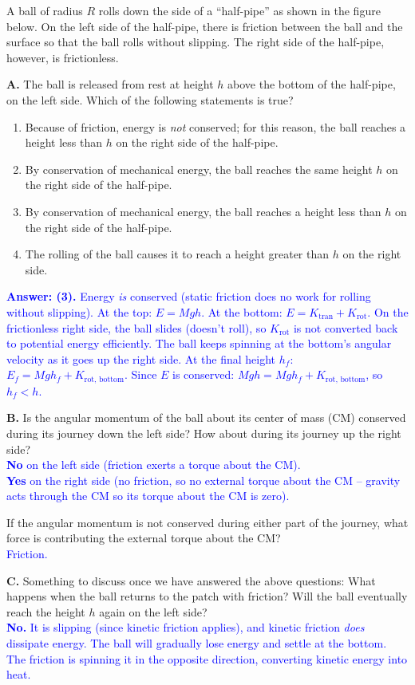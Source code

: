 \documentclass[11pt, letterpaper, openany]{book}
\newenvironment{exercise}[1][Exercise]{%
  \tcolorbox[blanker, breakable, left=1em,
    before skip=1em, after skip=1em,
    borderline west={3pt}{0pt}{PhysNavy},
    colback=PhysCream,
    before upper={\textcolor{PhysNavy}{\sffamily\bfseries #1:}\space}
  ]%
}{%
  \endtcolorbox%
}
\begin{document}
\begin{exercise}[Exercise 5]
A ball of radius $R$ rolls down the side of a ``half-pipe'' as shown in the figure below. On the left side of the half-pipe, there is friction between the ball and the surface so that the ball rolls without slipping. The right side of the half-pipe, however, is frictionless.

\textbf{A.} The ball is released from rest at height $h$ above the bottom of the half-pipe, on the left side. Which of the following statements is true?
\begin{enumerate}
    \item Because of friction, energy is \textit{not} conserved; for this reason, the ball reaches a height less than $h$ on the right side of the half-pipe.
    \item By conservation of mechanical energy, the ball reaches the same height $h$ on the right side of the half-pipe.
    \item By conservation of mechanical energy, the ball reaches a height less than $h$ on the right side of the half-pipe.
    \item The rolling of the ball causes it to reach a height greater than $h$ on the right side.
\end{enumerate}
\textcolor{blue}{
\textbf{Answer: (3).} Energy \textit{is} conserved (static friction does no work for rolling without slipping). At the top: $E = Mgh$. At the bottom: $E = K_{\text{tran}} + K_{\text{rot}}$. On the frictionless right side, the ball slides (doesn't roll), so $K_{\text{rot}}$ is not converted back to potential energy efficiently. The ball keeps spinning at the bottom's angular velocity as it goes up the right side. At the final height $h_f$: $E_f = Mgh_f + K_{\text{rot, bottom}}$. Since $E$ is conserved: $Mgh = Mgh_f + K_{\text{rot, bottom}}$, so $h_f < h$.
}

\textbf{B.} Is the angular momentum of the ball about its center of mass (CM) conserved during its journey down the left side? How about during its journey up the right side? \\
\textcolor{blue}{
\textbf{No} on the left side (friction exerts a torque about the CM). \\
\textbf{Yes} on the right side (no friction, so no external torque about the CM -- gravity acts through the CM so its torque about the CM is zero).
}

If the angular momentum is not conserved during either part of the journey, what force is contributing the external torque about the CM? \\
\textcolor{blue}{Friction.}

\textbf{C.} Something to discuss once we have answered the above questions: What happens when the ball returns to the patch with friction? Will the ball eventually reach the height $h$ again on the left side? \\
\textcolor{blue}{
\textbf{No.} It is slipping (since kinetic friction applies), and kinetic friction \textit{does} dissipate energy. The ball will gradually lose energy and settle at the bottom. The friction is spinning it in the opposite direction, converting kinetic energy into heat.
}
\end{exercise}
\end{document}
